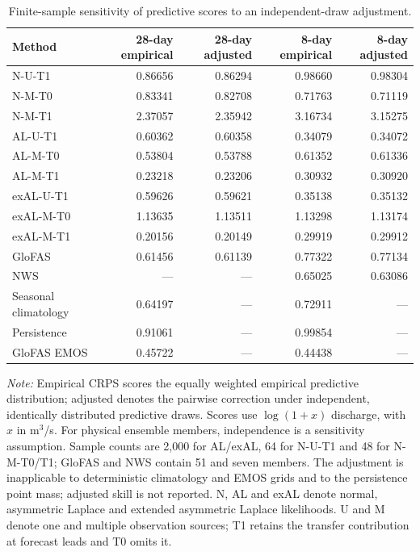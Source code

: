 \begin{table}[!htbp]
\centering
\begin{threeparttable}
\caption{Finite-sample sensitivity of predictive scores to an independent-draw adjustment.}
\label{tab:no_refit_sensitivity}
\fontsize{8.5}{10.5}\selectfont
\setlength{\tabcolsep}{4pt}
\begin{tabular}{lrrrr}
\hline
Method & 28-day empirical & 28-day adjusted & 8-day empirical & 8-day adjusted \\
\hline
N-U-T1 & 0.86656 & 0.86294 & 0.98660 & 0.98304 \\
N-M-T0 & 0.83341 & 0.82708 & 0.71763 & 0.71119 \\
N-M-T1 & 2.37057 & 2.35942 & 3.16734 & 3.15275 \\
AL-U-T1 & 0.60362 & 0.60358 & 0.34079 & 0.34072 \\
AL-M-T0 & 0.53804 & 0.53788 & 0.61352 & 0.61336 \\
AL-M-T1 & 0.23218 & 0.23206 & 0.30932 & 0.30920 \\
exAL-U-T1 & 0.59626 & 0.59621 & 0.35138 & 0.35132 \\
exAL-M-T0 & 1.13635 & 1.13511 & 1.13298 & 1.13174 \\
exAL-M-T1 & 0.20156 & 0.20149 & 0.29919 & 0.29912 \\
GloFAS & 0.61456 & 0.61139 & 0.77322 & 0.77134 \\
NWS & --- & --- & 0.65025 & 0.63086 \\
Seasonal climatology & 0.64197 & --- & 0.72911 & --- \\
Persistence & 0.91061 & --- & 0.99854 & --- \\
GloFAS EMOS & 0.45722 & --- & 0.44438 & --- \\
\hline
\end{tabular}
\begin{tablenotes}
\fontsize{8}{10}\selectfont
\item \textit{Note:} Empirical CRPS scores the equally weighted empirical predictive distribution; adjusted denotes the pairwise correction under independent, identically distributed predictive draws. Scores use $\log(1+x)$ discharge, with $x$ in m$^3$/s. For physical ensemble members, independence is a sensitivity assumption. Sample counts are 2,000 for AL/exAL, 64 for N-U-T1 and 48 for N-M-T0/T1; GloFAS and NWS contain 51 and seven members. The adjustment is inapplicable to deterministic climatology and EMOS grids and to the persistence point mass; adjusted skill is not reported. N, AL and exAL denote normal, asymmetric Laplace and extended asymmetric Laplace likelihoods. U and M denote one and multiple observation sources; T1 retains the transfer contribution at forecast leads and T0 omits it.
\end{tablenotes}
\end{threeparttable}
\end{table}
